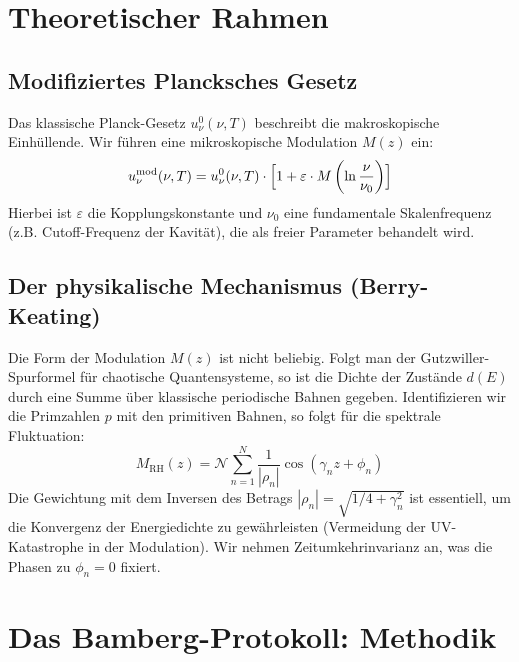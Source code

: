 \documentclass[11pt, a4paper]{article}
\begin{document}
	\section{Theoretischer Rahmen}
	
	\subsection{Modifiziertes Plancksches Gesetz}
	Das klassische Planck-Gesetz $u_\nu^{0}(\nu,T)$ beschreibt die makroskopische Einhüllende. Wir führen eine mikroskopische Modulation $M(z)$ ein:
	\begin{equation}
		u_\nu^{\text{mod}}(\nu,T) = u_\nu^{0}(\nu,T) \cdot \Bigl[ 1 + \varepsilon \cdot M\left(\ln\frac{\nu}{\nu_0}\right) \Bigr]
	\end{equation}
	Hierbei ist $\varepsilon$ die Kopplungskonstante und $\nu_0$ eine fundamentale Skalenfrequenz (z.B. Cutoff-Frequenz der Kavität), die als freier Parameter behandelt wird.
	
	\subsection{Der physikalische Mechanismus (Berry-Keating)}
	Die Form der Modulation $M(z)$ ist nicht beliebig. Folgt man der Gutzwiller-Spurformel für chaotische Quantensysteme, so ist die Dichte der Zustände $d(E)$ durch eine Summe über klassische periodische Bahnen gegeben. Identifizieren wir die Primzahlen $p$ mit den primitiven Bahnen, so folgt für die spektrale Fluktuation:
	\begin{equation}
		M_{\text{RH}}(z) = \mathcal{N} \sum_{n=1}^{N} \frac{1}{|\rho_n|} \cos(\gamma_n z + \phi_n)
	\end{equation}
	Die Gewichtung mit dem Inversen des Betrags $|\rho_n| = \sqrt{1/4 + \gamma_n^2}$ ist essentiell, um die Konvergenz der Energiedichte zu gewährleisten (Vermeidung der UV-Katastrophe in der Modulation). Wir nehmen Zeitumkehrinvarianz an, was die Phasen zu $\phi_n = 0$ fixiert.
	
	\section{Das Bamberg-Protokoll: Methodik}
	
\end{document}

